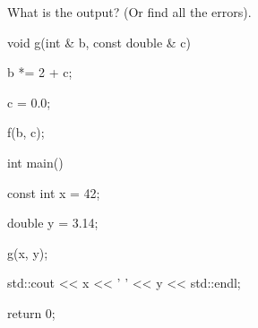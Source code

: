 What is the output? (Or find all the errors).



\begin{consolethree}[escapeinside=||]

void g(int & b, const double & c)

{

    b *= 2 + c;

    c = 0.0;

    f(b, c);

}



int main()

{

    const int x = 42;

    double y = 3.14;

    g(x, y);

    std::cout << x << ' ' << y << std::endl;

    return 0;

}

\end{consolethree}

